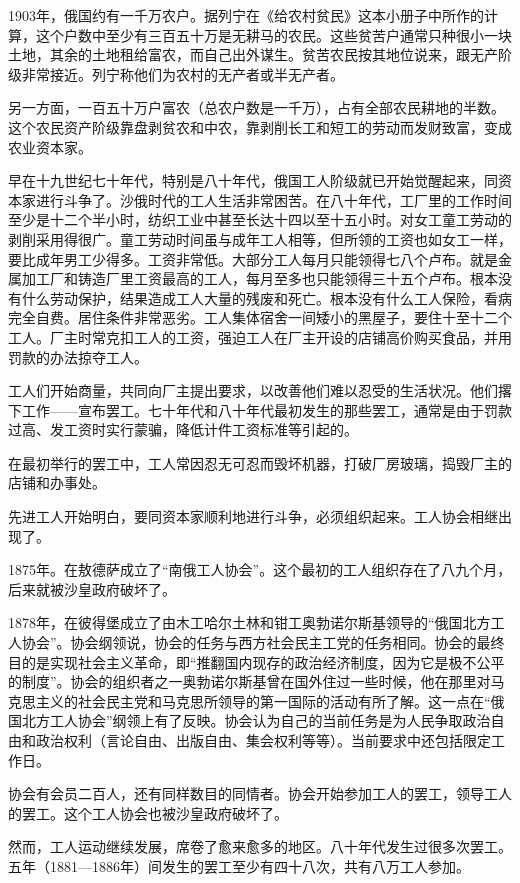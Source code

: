 1903年，俄国约有一千万农户。据列宁在《给农村贫民》这本小册子中所作的计算，这个户数中至少有三百五十万是无耕马的农民。这些贫苦户通常只种很小一块土地，其余的土地租给富农，而自己出外谋生。贫苦农民按其地位说来，跟无产阶级非常接近。列宁称他们为农村的无产者或半无产者。

另一方面，一百五十万户富农（总农户数是一千万），占有全部农民耕地的半数。这个农民资产阶级靠盘剥贫农和中农，靠剥削长工和短工的劳动而发财致富，变成农业资本家。

早在十九世纪七十年代，特别是八十年代，俄国工人阶级就已开始觉醒起来，同资本家进行斗争了。沙俄时代的工人生活非常困苦。在八十年代，工厂里的工作时间至少是十二个半小时，纺织工业中甚至长达十四以至十五小时。对女工童工劳动的剥削采用得很广。童工劳动时间虽与成年工人相等，但所领的工资也如女工一样，要比成年男工少得多。工资非常低。大部分工人每月只能领得七八个卢布。就是金属加工厂和铸造厂里工资最高的工人，每月至多也只能领得三十五个卢布。根本没有什么劳动保护，结果造成工人大量的残废和死亡。根本没有什么工人保险，看病完全自费。居住条件非常恶劣。工人集体宿舍一间矮小的黑屋子，要住十至十二个工人。厂主时常克扣工人的工资，强迫工人在厂主开设的店铺高价购买食品，并用罚款的办法掠夺工人。

工人们开始商量，共同向厂主提出要求，以改善他们难以忍受的生活状况。他们撂下工作——宣布罢工。七十年代和八十年代最初发生的那些罢工，通常是由于罚款过高、发工资时实行蒙骗，降低计件工资标准等引起的。

在最初举行的罢工中，工人常因忍无可忍而毁坏机器，打破厂房玻璃，捣毁厂主的店铺和办事处。

先进工人开始明白，要同资本家顺利地进行斗争，必须组织起来。工人协会相继出现了。

1875年。在敖德萨成立了“南俄工人协会”。这个最初的工人组织存在了八九个月，后来就被沙皇政府破坏了。

1878年，在彼得堡成立了由木工哈尔土林和钳工奥勃诺尔斯基领导的“俄国北方工人协会”。协会纲领说，协会的任务与西方社会民主工党的任务相同。协会的最终目的是实现社会主义革命，即“推翻国内现存的政治经济制度，因为它是极不公平的制度”。协会的组织者之一奥勃诺尔斯基曾在国外住过一些时候，他在那里对马克思主义的社会民主党和马克思所领导的第一国际的活动有所了解。这一点在“俄国北方工人协会”纲领上有了反映。协会认为自己的当前任务是为人民争取政治自由和政治权利（言论自由、出版自由、集会权利等等）。当前要求中还包括限定工作日。

协会有会员二百人，还有同样数目的同情者。协会开始参加工人的罢工，领导工人的罢工。这个工人协会也被沙皇政府破坏了。

然而，工人运动继续发展，席卷了愈来愈多的地区。八十年代发生过很多次罢工。五年（1881—1886年）间发生的罢工至少有四十八次，共有八万工人参加。

